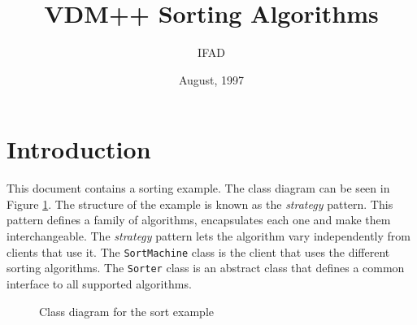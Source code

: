 \documentclass[\pformat,12pt]{article}
\title{VDM++ Sorting Algorithms}
\author{IFAD}
\date{August, 1997}
\begin{document}
\maketitle

\section{Introduction}

This document contains a sorting example. The class diagram can be
seen in Figure \ref{inh}.  The structure of the example is known as
the \textit{strategy} pattern. This pattern defines a family of
algorithms, encapsulates each one and make them interchangeable. The
\textit{strategy} pattern lets the algorithm vary independently from
clients that use it. The \texttt{SortMachine} class is the client that uses the
different sorting algorithms. The \texttt{Sorter} class is an abstract class
that defines a common interface to all supported algorithms.


\begin{figure}[tbh]
\begin{center}
\mbox{}
\caption{Class diagram for the sort example}\label{inh}
\end{center}
\end{figure}













\newpage
{}
\printindex
\end{document}

